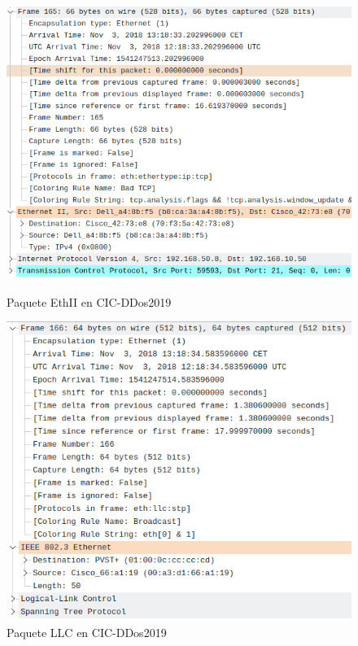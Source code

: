 \begin{figure}[H]
      \includegraphics[width=\linewidth]{media/cicddos_2019_pcap_03-11_0_ethii_packet.png}
      \captionsetup{justification=centering}
      \caption{Paquete EthII en CIC-DDos2019}\label{fig:cicddos_2019_pcap_03-11_0_ethii_packet}
    \endminipage\hfill
      \includegraphics[width=\linewidth]{media/cicddos_2019_pcap_03-11_0_llc_packet.png}
      \captionsetup{justification=centering}
      \caption{Paquete LLC en CIC-DDos2019}\label{fig:cicddos_2019_pcap_03-11_0_llc_packet}
    \endminipage\hfill
\end{figure}
